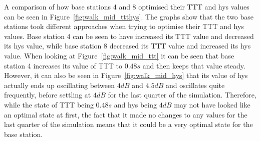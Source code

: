 A comparison of how base stations 4 and 8 optimised their TTT and hys values can be seen in Figure~\ref{fig:walk_mid_ttthys}. The graphs show that the two base stations took different approaches when trying to optimise their TTT and hys values. Base station 4 can be seen to have increased its TTT value and decreased its hys value, while base station 8 decreased its TTT value and increased its hys value. When looking at Figure~\ref{fig:walk_mid_ttt} it can be seen that base station 4 increases its value of TTT to $0.48 s$ and then keeps that value steady. However, it can also be seen in Figure~\ref{fig:walk_mid_hys} that its value of hys actually ends up oscillating between $4 dB$ and $4.5 dB$ and oscillates quite frequently, before settling at $4 dB$ for the last quarter of the simulation. Therefore, while the state of TTT being $0.48 s$ and hys being $4 dB$ may not have looked like an optimal state at first, the fact that it made no changes to any values for the last quarter of the simulation means that it could be a very optimal state for the base station.

